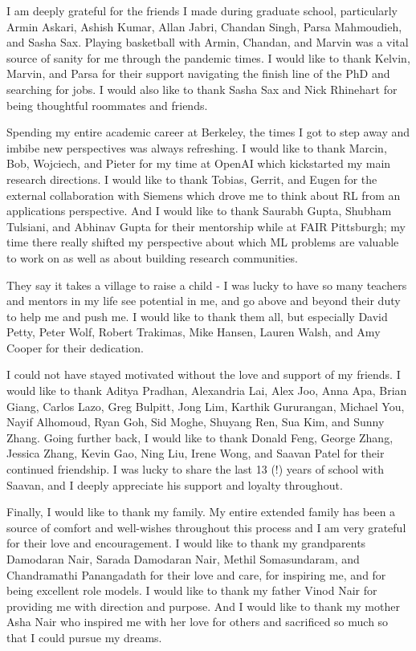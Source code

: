 I am deeply grateful for the friends I made during graduate school, particularly Armin Askari, Ashish Kumar, Allan Jabri, Chandan Singh, Parsa Mahmoudieh, and Sasha Sax.
Playing basketball with Armin, Chandan, and Marvin was a vital source of sanity for me through the pandemic times.
I would like to thank Kelvin, Marvin, and Parsa for their support navigating the finish line of the PhD and searching for jobs.
I would also like to thank Sasha Sax and Nick Rhinehart for being thoughtful roommates and friends.

Spending my entire academic career at Berkeley, the times I got to step away and imbibe new perspectives was always refreshing.
I would like to thank Marcin, Bob, Wojciech, and Pieter for my time at OpenAI which kickstarted my main research directions.
I would like to thank Tobias, Gerrit, and Eugen for the external collaboration with Siemens which drove me to think about RL from an applications perspective.
And I would like to thank Saurabh Gupta, Shubham Tulsiani, and Abhinav Gupta for their mentorship while at FAIR Pittsburgh; my time there really shifted my perspective about which ML problems are valuable to work on as well as about building research communities.

They say it takes a village to raise a child - I was lucky to have so many teachers and mentors in my life see potential in me, and go above and beyond their duty to help me and push me. I would like to thank them all, but especially David Petty, Peter Wolf, Robert Trakimas, Mike Hansen, Lauren Walsh, and Amy Cooper for their dedication.

I could not have stayed motivated without the love and support of my friends.
I would like to thank Aditya Pradhan, Alexandria Lai, Alex Joo, Anna Apa, Brian Giang, Carlos Lazo, Greg Bulpitt, Jong Lim, Karthik Gururangan, Michael You, Nayif Alhomoud, Ryan Goh, Sid Moghe, Shuyang Ren, Sua Kim, and Sunny Zhang.
Going further back, I would like to thank Donald Feng, George Zhang, Jessica Zhang, Kevin Gao, Ning Liu, Irene Wong, and Saavan Patel for their continued friendship.
I was lucky to share the last 13 (!) years of school with Saavan, and I deeply appreciate his support and loyalty throughout.

Finally, I would like to thank my family.
My entire extended family has been a source of comfort and well-wishes throughout this process and I am very grateful for their love and encouragement.
I would like to thank my grandparents Damodaran Nair, Sarada Damodaran Nair, Methil Somasundaram, and Chandramathi Panangadath for their love and care, for inspiring me, and for being excellent role models.
I would like to thank my father Vinod Nair for providing me with direction and purpose.
And I would like to thank my mother Asha Nair who inspired me with her love for others and sacrificed so much so that I could pursue my dreams.
